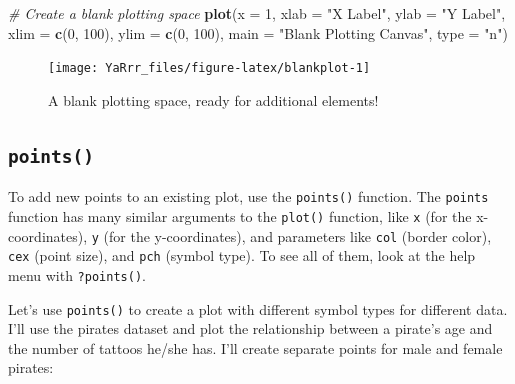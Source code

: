 \documentclass[]{book}
\newenvironment{Shaded}{\begin{snugshade}}{\end{snugshade}}
\newcommand{\KeywordTok}[1]{\textcolor[rgb]{0.13,0.29,0.53}{\textbf{#1}}}
\newcommand{\DataTypeTok}[1]{\textcolor[rgb]{0.13,0.29,0.53}{#1}}
\newcommand{\DecValTok}[1]{\textcolor[rgb]{0.00,0.00,0.81}{#1}}
\newcommand{\StringTok}[1]{\textcolor[rgb]{0.31,0.60,0.02}{#1}}
\newcommand{\CommentTok}[1]{\textcolor[rgb]{0.56,0.35,0.01}{\textit{#1}}}
\newcommand{\NormalTok}[1]{#1}
\theoremstyle{definition}
\theoremstyle{definition}
\theoremstyle{remark}
\begin{document}
\begin{Shaded}
\begin{Highlighting}[]
\CommentTok{# Create a blank plotting space}
\KeywordTok{plot}\NormalTok{(}\DataTypeTok{x =} \DecValTok{1}\NormalTok{,                 }
     \DataTypeTok{xlab =} \StringTok{"X Label"}\NormalTok{, }
     \DataTypeTok{ylab =} \StringTok{"Y Label"}\NormalTok{,}
     \DataTypeTok{xlim =} \KeywordTok{c}\NormalTok{(}\DecValTok{0}\NormalTok{, }\DecValTok{100}\NormalTok{), }
     \DataTypeTok{ylim =} \KeywordTok{c}\NormalTok{(}\DecValTok{0}\NormalTok{, }\DecValTok{100}\NormalTok{),}
     \DataTypeTok{main =} \StringTok{"Blank Plotting Canvas"}\NormalTok{,}
     \DataTypeTok{type =} \StringTok{"n"}\NormalTok{)}
\end{Highlighting}
\end{Shaded}

\begin{figure}

{\centering \texttt{[image: YaRrr\_files/figure-latex/blankplot-1]} 

}

\caption{A blank plotting space, ready for additional elements!}\label{fig:blankplot}
\end{figure}

\subsection{\texorpdfstring{\texttt{points()}}{points()}}\label{points}

To add new points to an existing plot, use the \texttt{points()}
function. The \texttt{points} function has many similar arguments to the
\texttt{plot()} function, like \texttt{x} (for the x-coordinates),
\texttt{y} (for the y-coordinates), and parameters like \texttt{col}
(border color), \texttt{cex} (point size), and \texttt{pch} (symbol
type). To see all of them, look at the help menu with
\texttt{?points()}.

Let's use \texttt{points()} to create a plot with different symbol types
for different data. I'll use the pirates dataset and plot the
relationship between a pirate's age and the number of tattoos he/she
has. I'll create separate points for male and female pirates:
\end{document}
